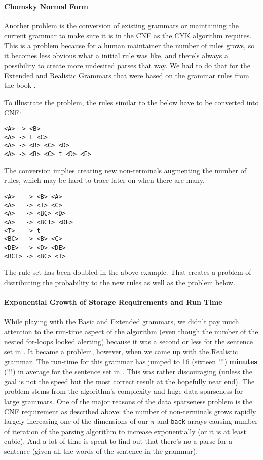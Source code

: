 \paragraph*{Chomsky Normal Form}

Another problem is the conversion of existing grammars
or maintaining the current grammar to make sure it is in the CNF
as the CYK algorithm \cite{cyk} requires. This is a problem because
for a human maintainer the number of rules grows, so it becomes
less obvious what a initial rule was like, and there's always
a possibility to create more undesired parses that way. We had
to do that for the Extended and Realistic Grammars that were
based on the grammar rules from the book \cite{jurafsky}.

To illustrate the problem, the rules similar to the
below have to be converted into CNF:

\begin{verbatim}
<A> -> <B>
<A> -> t <C>
<A> -> <B> <C> <D>
<A> -> <B> <C> t <D> <E>
\end{verbatim}

The conversion implies creating new non-terminals augmenting
the number of rules, which may be hard to trace later on when
there are many.

\begin{verbatim}
<A>   -> <B> <A>
<A>   -> <T> <C>
<A>   -> <BC> <D>
<A>   -> <BCT> <DE>
<T>   -> t
<BC>  -> <B> <C>
<DE>  -> <D> <DE>
<BCT> -> <BC> <T>
\end{verbatim}

The rule-set has been doubled in the above example. That creates
a problem of distributing the probability to the new rules as
well as the problem below.

\paragraph*{Exponential Growth of Storage Requirements and Run Time}

While playing with the Basic and Extended grammars, we didn't pay
much attention to the run-time aspect of the algorithm (even though
the number of the nested for-loops looked alerting) because
it was a second or less for the sentence set in .
It became a problem, however, when we came up with the Realistic
grammar. The run-time for this grammar has jumped to 16 (sixteen !!!)
{\bf minutes} (!!!) in average for the sentence set in .
This was rather discouraging (unless the goal is not the speed but
the most correct result at the hopefully near end). The problem stems
from the algorithm's complexity and huge data sparseness for large grammars.
One of the major reasons of the data sparseness problem is the CNF requirement as
described above: the number of non-terminals grows rapidly largely
increasing one of the dimensions of our $\pi$ and \verb+back+ arrays causing
number of iteration of the parsing algorithm to increase exponentially (or it is
at least cubic). And a lot of time is spent to find out that there's no
a parse for a sentence (given all the words of the sentence in the grammar).

